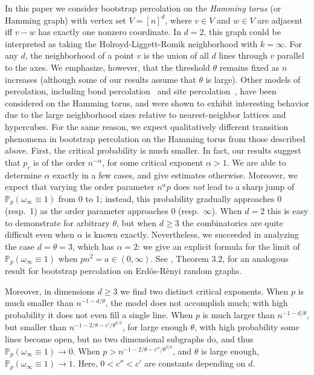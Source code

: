 \documentclass{amsart}
\newcommand{\prob}{\mathbb{P}}
\newcommand{\threshold}{\theta}
\numberwithin{equation}{section}
\theoremstyle{definition}
\theoremstyle{remark}
\begin{document}
In this paper we consider bootstrap percolation on the {\it Hamming torus\/} (or Hamming graph) with vertex set $V = [n]^d$, where $v\in V$ and $w\in V$ are adjacent iff $v-w$ has exactly one nonzero coordinate.  
In $d=2$, this graph could be interpreted as taking the Holroyd-Liggett-Romik neighborhood \cite{hlr} with $k=\infty$. For any $d$, the neighborhood of a point $v$ is the union of all $d$ lines through $v$ parallel to the axes. We emphasize, however, that the threshold $\threshold$ remains fixed as $n$ increases (although some of our results assume that $\threshold$ is large).  Other models of percolation, including bond percolation~\cite{BCHSS:2005, HL:2010} and site percolation~\cite{S:2010}, have been considered on the Hamming torus, and were shown to exhibit interesting behavior due to the large neighborhood sizes relative to nearest-neighbor lattices and hypercubes.  For the same reason, we expect qualitatively different transition phenomena in bootstrap percolation on the Hamming torus from those described above. First, the critical probability is much smaller. In fact, our results suggest that 
$p_c$ is of the order $n^{-\alpha}$, for some critical exponent $\alpha > 1$. We are able to determine $\alpha$ exactly in a few cases, and give estimates otherwise. Moreover, we expect that varying the order parameter $n^{\alpha}p$ does {\it not\/} lead to a sharp jump of $\prob_{p}(\omega_\infty\equiv1)$ from 0 to 1; instead, this probability gradually approaches 0 (resp.~1) as the order parameter approaches 0 (resp.~$\infty$). When $d=2$ this is easy to demonstrate for arbitrary $\threshold$, but when $d\ge 3$ the combinatorics are quite difficult even when $\alpha$ is known exactly. Nevertheless, we succeeded in analyzing the case $d=\theta=3$, which has $\alpha=2$: we give an explicit formula for the limit of $\prob_{p} (\omega_\infty\equiv1)$ when $pn^2=a\in(0,\infty)$.  See \cite{JLTV}, Theorem 3.2, for an analogous result
for bootstrap percolation on Erd\"os-R\`enyi random graphs.


Moreover, in dimensions $d\ge 3$  we find two distinct critical exponents. When $p$ is much smaller than $n^{-1-d/\theta}$, the model does not accomplish much; with high probability it does not even fill a single line. When $p$ is much larger than $n^{-1-d/\theta}$, but smaller than $n^{-1-2/\theta-c'/\threshold^{3/2}}$, for 
 large enough $\theta$, with high probability some lines become open, but no two dimensional subgraphs do, and thus $\prob_{p}(\omega_\infty\equiv1)\to 0$. When $p>n^{-1-2/\theta-c''/\threshold^{3/2}}$, and $\threshold$ is large 
enough,
$\prob_{p}(\omega_\infty\equiv1)\to 1$. Here, $0<c''<c'$ are constants depending on $d$.  
\end{document}
